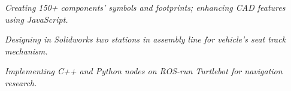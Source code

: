 \documentclass{resume}
\begin{document}
\textit{Creating 150+ components' symbols and footprints; enhancing CAD features using JavaScript.}

\textit{Designing in Solidworks two stations in assembly line for vehicle's seat track mechanism.}

\textit{Implementing C++ and Python nodes on ROS-run Turtlebot for navigation research.}
\end{document}
